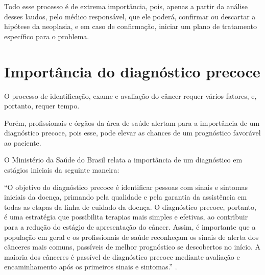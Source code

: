 Todo esse processo é de extrema importância, pois, apenas a partir da análise desses laudos,
pelo médico responsável, que ele poderá, confirmar ou descartar a hipótese da neoplasia, e em caso de confirmação,
iniciar um plano de tratamento específico para o problema.


\section{\textbf{Importância do diagnóstico precoce}}

O processo de identificação, exame e avaliação do câncer requer vários fatores, e, portanto, requer tempo.

Porém, profissionais e órgãos da área de saúde alertam para a importância de um diagnóstico precoce,
pois esse, pode elevar as chances de um prognóstico favorável ao paciente.

O Ministério da Saúde do Brasil relata a importância de um diagnóstico em estágios iniciais da seguinte maneira:

“O objetivo do diagnóstico precoce é identificar pessoas com sinais e sintomas iniciais da doença,
primando pela qualidade e pela garantia da assistência em todas as etapas da linha de cuidado da doença.
O diagnóstico precoce, portanto, é uma estratégia que possibilita terapias mais simples e efetivas,
ao contribuir para a redução do estágio de apresentação do câncer.
Assim, é importante que a população em geral e os profissionais de saúde reconheçam os sinais de alerta dos cânceres mais comuns,
passíveis de melhor prognóstico se descobertos no início.
A maioria dos cânceres é passível de diagnóstico precoce mediante avaliação e encaminhamento após os primeiros sinais e sintomas.”
\cite{DIAGNOSTICO}.

